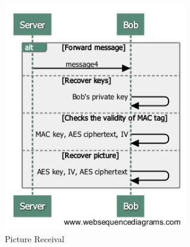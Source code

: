 	    
	    \begin{figure}[H]
	    
	      \centering
	      \includegraphics[width=8cm]{images/architecture/receive}
	      \caption{Picture Receival}
	      \label{Figure 5}
	     
	    \end{figure}

	    
	    
	    




	  
      
      
     
      


	
  